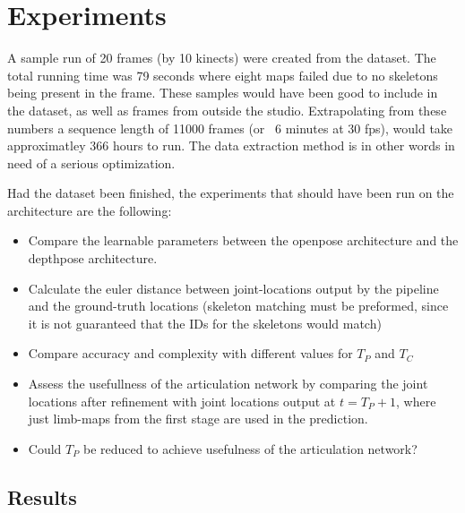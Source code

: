 \chapter{Experiments}


A sample run of 20 frames (by 10 kinects) were created from the dataset. The total running time was 79 seconds where eight maps failed due to no skeletons being present in the frame. These samples would have been good to include in the dataset, as well as frames from outside the studio.
Extrapolating from these numbers a sequence length of 11000 frames (or ~6 minutes at 30 fps), would take approximatley 366 hours to run. The data extraction method is in other words in need of a serious optimization.

Had the dataset been finished, the experiments that should have been run on the architecture are the following:
\begin{itemize}
\item Compare the learnable parameters between the openpose architecture and the depthpose architecture.
\item Calculate the euler distance between joint-locations output by the pipeline and the ground-truth locations (skeleton matching must be preformed, since it is not guaranteed that the IDs for the skeletons would match)
\item Compare accuracy and complexity with different values for $T_{P}$ and $T_{C}$
\item Assess the usefullness of the articulation network by comparing the joint locations after refinement with joint locations output at $t = T_{P} + 1$, where just limb-maps from the first stage are used in the prediction.
\item Could $T_{P}$ be reduced to achieve usefulness of the articulation network?
\end{itemize}


\section{Results}
